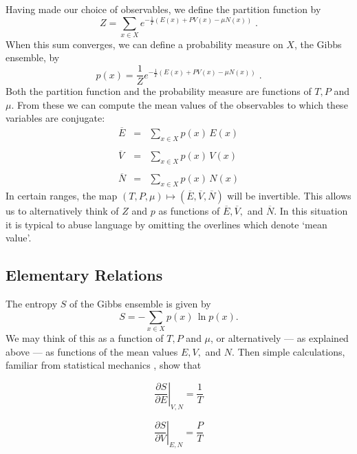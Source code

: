 \documentclass[12pt,twoside,openright]{report}
\begin{document}
Having made our choice of observables, we define the partition function by 
\[     Z = \sum_{x \in X} e^{-\frac{1}{T}(E(x) + P V(x) - \mu N(x))} \; .\]
When this sum converges, we can define a probability measure on $X$, the Gibbs ensemble, by
\[    p(x) = \frac{1}{Z} e^{-\frac{1}{T}(E(x) + P V(x) - \mu N(x))} \; .\]
Both the partition function and the probability measure are functions of $T, P$ and $\mu$.  From these we can compute the mean values of the observables to which these variables are conjugate:
\[
\begin{array}{ccc} 
    \overline{E} &=& \displaystyle{\sum_{x \in X}} p(x) \, E(x)   \\
                                                   \\
    \overline{V} &=& \displaystyle{\sum_{x \in X}} p(x) \, V(x)   \\
                                                   \\
    \overline{N} &=& \displaystyle{\sum_{x \in X}} p(x) \, N(x)   
\end{array}
\]
In certain ranges, the map $(T,P,\mu) \mapsto (\overline{E},
\overline{V}, \overline{N})$ will be invertible.  This allows us to alternatively think of $Z$ and $p$ as functions of $\overline{E}, \overline{V},$ and $\overline{N}$. In this situation it is typical to abuse language by omitting the overlines which denote `mean value'.

\subsection{Elementary Relations} \label{elementary}

The entropy $S$ of the Gibbs ensemble is given by
\[      S = - \sum_{x \in X} p(x)\, \ln p(x) .\]
We may think of this as a function of $T, P$ and $\mu$, or alternatively --- as explained above --- as functions of the mean values $E, V,$ and $N$.  Then simple calculations, familiar from statistical mechanics \cite{Reif}, show that

\begin{equation}
\label{derivative1}
\displaystyle{\left.\frac{\partial S}{\partial E}\right|_{V,N}}  =
\displaystyle{\frac{1}{T}} 
\end{equation}

\begin{equation}
\label{derivative2}
\displaystyle{\left.\frac{\partial S}{\partial V}\right|_{E,N}}  =
\displaystyle{\frac{P}{T}} 
\end{equation}
\end{document}
